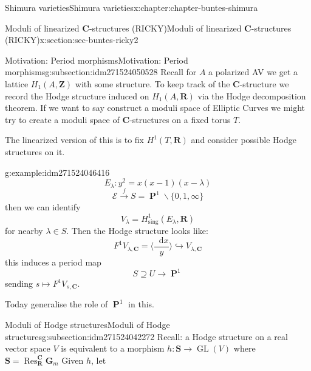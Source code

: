 \documentclass[oneside,10pt,]{book}
\numberwithin{equation}{section}
\newcommand{\diff}{\mathop{}\!\mathrm{d}}
\newcommand{\ZZ}{\mathbf{Z}}
\newcommand{\RR}{\mathbf{R}}
\newcommand{\CC}{\mathbf{C}}
\newcommand{\sing}{\mathrm{sing}}
\DeclareMathOperator{\Res}{Res}
\DeclareMathOperator{\PP}{\mathbf{P}}
\DeclareMathOperator{\GL}{GL}
\begin{document}
\begin{chapterptx}{Shimura varieties}{}{Shimura varieties}{}{}{x:chapter:chapter-buntes-shimura}
\begin{sectionptx}{Moduli of linearized \(\CC\)-structures (RICKY)}{}{Moduli of linearized \(\CC\)-structures (RICKY)}{}{}{x:section:sec-buntes-ricky2}
%
%
\typeout{************************************************}
\typeout{************************************************}
%
\begin{subsectionptx}{Motivation: Period morphisms}{}{Motivation: Period morphisms}{}{}{g:subsection:idm271524050528}
Recall for  \(A\) a  polarized AV we get a lattice \(H_1(A,\ZZ)\) with some structure. To keep track of the \(\CC\)-structure  we record the Hodge structure induced on \(H_1(A,\RR)\) via the Hodge decomposition theorem. If we want to say construct a moduli space of Elliptic Curves we might try to create a moduli space of \(\CC\)-structures on a fixed torus \(T\).%
\par
The linearized version of this is to fix \(H^1(T, \RR)\) and consider possible Hodge structures on it.%
\begin{example}{}{g:example:idm271524046416}%
%
\begin{equation*}
E_\lambda \colon y^2 = x(x-1) (x-\lambda)
\end{equation*}
%
\begin{equation*}
\mathcal E \xrightarrow f S = \PP^1 \smallsetminus \{0,1,\infty\}
\end{equation*}
then we can identify%
\begin{equation*}
V_\lambda = H^1_\sing(E_\lambda, \RR)
\end{equation*}
for nearby \(\lambda \in S\). Then the Hodge structure looks like:%
\begin{equation*}
F^1 V_{\lambda, \CC} = \langle \frac{\diff x}{y} \rangle \hookrightarrow V_{\lambda, \CC}
\end{equation*}
this induces a period map%
\begin{equation*}
S\supseteq U \to \PP^1
\end{equation*}
sending \(s \mapsto F^1V_{s, \CC}\).%
\end{example}
Today generalise the role of \(\PP^1\) in this.%
\end{subsectionptx}
%
%
\typeout{************************************************}
\typeout{************************************************}
%
\begin{subsectionptx}{Moduli of Hodge structures}{}{Moduli of Hodge structures}{}{}{g:subsection:idm271524042272}
Recall: a Hodge structure on a real vector space \(V\) is equivalent to a morphism \(h \colon \mathbf S \to \GL(V)\) where \(\mathbf S  = \Res_\RR^\CC \mathbf G_m\) Given \(h\), let%

\end{subsectionptx}
\end{sectionptx}
\end{chapterptx}
\end{document}
